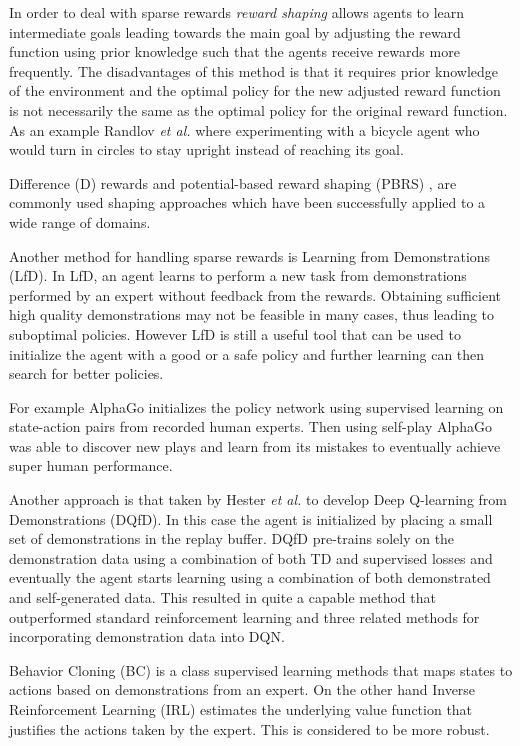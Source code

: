 In order to deal with sparse rewards \emph{reward shaping} allows agents to learn intermediate goals leading towards the main goal by adjusting the reward function using prior knowledge such that the agents receive rewards more frequently\cite{wiewiora2010reward}. The disadvantages of this method is that it requires prior knowledge of the environment and the optimal policy for the new adjusted reward function is not necessarily the same as the optimal policy for the original reward function. As an example Randlov \emph{et al.} \cite{randlov1998learning} where experimenting with a bicycle agent who would turn in circles to stay upright instead of reaching its goal.

Difference (D) \cite{wolpert2000collective} rewards and potential-based reward shaping (PBRS) \cite{ng1999policy}, are commonly used shaping approaches which have been successfully applied to a wide range of domains. 


Another method for handling sparse rewards is Learning from Demonstrations (LfD). In LfD, an agent learns to perform a new task from demonstrations performed by an expert without feedback from the rewards. Obtaining sufficient high quality demonstrations may not be feasible in many cases, thus leading to suboptimal policies. However LfD is still a useful tool that can be used to initialize the agent with a good or a safe policy and further learning can then search for better policies. 

For example AlphaGo \cite{silver2016mastering} initializes the policy network using supervised learning on state-action pairs from recorded human experts. Then using self-play AlphaGo was able to discover new plays and learn from its mistakes to eventually achieve super human performance.

Another approach is that taken by Hester \emph{et al.} \cite{hester2018deep} to develop Deep Q-learning from Demonstrations (DQfD). In this case the agent is initialized by placing a small set of demonstrations in the replay buffer. DQfD pre-trains solely on the demonstration data using a combination of both TD and supervised losses and eventually the agent starts learning using a combination of both demonstrated and self-generated data. This resulted in quite a capable method that outperformed standard reinforcement learning and three related methods for incorporating demonstration data into DQN.

Behavior Cloning (BC) is a class supervised learning methods that maps states to actions based on demonstrations from an expert. On the other hand Inverse Reinforcement Learning (IRL) estimates the underlying value function that justifies the actions taken by the expert. This is considered to be more robust.

